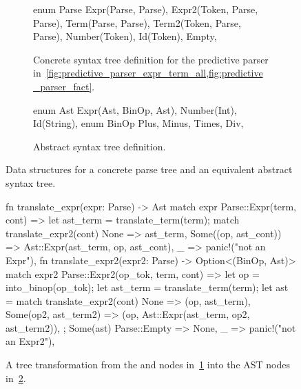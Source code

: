 \documentclass[
  oneside,
  english,
  coorientadorbanca,
  noabntexcite
]{ufsc-thesis-rn46-2019}
\newcommand{\code}[1]{\text{\scpfamily\setlength\spaceskip{0.35em}#1}}
\begin{document}
\begin{figure}[ht]
  \centering
  \begin{subfigure}[b]{0.45\textwidth}
    \begin{minipage}{\textwidth}
      \begin{rustcode}
enum Parse {
  Expr(Parse, Parse),
  Expr2(Token, Parse, Parse),
  Term(Parse, Parse),
  Term2(Token, Parse, Parse),
  Number(Token),
  Id(Token),
  Empty,
}
      \end{rustcode}
    \end{minipage}
    \caption{
      Concrete syntax tree definition for the predictive parser in~\cref{fig:predictive_parser_expr_term_all,fig:predictive_parser_fact}.
    }\label{fig:abstract_syntax_adt_a} \end{subfigure}
  \qquad
  \begin{subfigure}[b]{0.45\textwidth}
    \begin{minipage}{\textwidth}
      \begin{rustcode}
enum Ast {
  Expr(Ast, BinOp, Ast),
  Number(Int),
  Id(String),
}
enum BinOp {
  Plus,
  Minus,
  Times,
  Div,
}
      \end{rustcode}
    \end{minipage}
    \caption{
      Abstract syntax tree definition.
    }\label{fig:abstract_syntax_adt_b}
  \end{subfigure}
  \caption{
    Data structures for a concrete parse tree and an equivalent abstract syntax tree.
  }\label{fig:abstract_syntax_adt}
\end{figure}

\begin{figure}[ht]
  \centering
  \begin{minipage}{0.9\textwidth}
    \begin{rustcode}
fn translate_expr(expr: Parse) -> Ast {
  match expr {
    Parse::Expr(term, cont) => {
      let ast_term = translate_term(term);
      match translate_expr2(cont) {
        None => ast_term,
        Some((op, ast_cont)) => Ast::Expr(ast_term, op, ast_cont),
      }
    }
    _ => panic!("not an Expr"),
  }
}
fn translate_expr2(expr2: Parse) -> Option<(BinOp, Ast)> {
  match expr2 {
    Parse::Expr2(op_tok, term, cont) => {
      let op = into_binop(op_tok);
      let ast_term = translate_term(term);
      let ast = match translate_expr2(cont) {
        None => (op, ast_term),
        Some(op2, ast_term2) => (op, Ast::Expr(ast_term, op2, ast_term2)),
      };
      Some(ast)
    }
    Parse::Empty => None,
    _ => panic!("not an Expr2"),
  }
}
    \end{rustcode}
  \end{minipage}
  \caption{
    A tree transformation from the \code{Expr} and \code{Expr2} nodes in~\cref{fig:abstract_syntax_adt_a} into the AST nodes in~\cref{fig:abstract_syntax_adt_b}.
  }\label{fig:cst_ast_translator_expr}
\end{figure}
\end{document}
